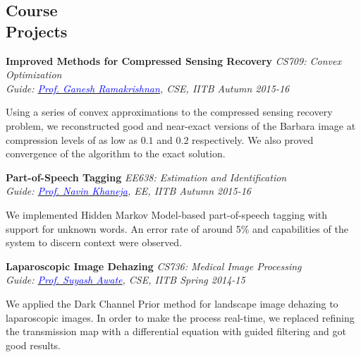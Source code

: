 \documentclass[margin,line]{res}
\newenvironment{list1}{
  \begin{list}{\ding{113}}{%
      \setlength{\itemsep}{0in}
      \setlength{\parsep}{0in} \setlength{\parskip}{0in}
      \setlength{\topsep}{0in} \setlength{\partopsep}{0in} 
      \setlength{\leftmargin}{0.17in}}}{\end{list}}
\begin{document}
\begin{resume}
\section{\sc Course \\Projects}
{\bf Improved Methods for Compressed Sensing Recovery} \hfill {\it CS709: Convex Optimization} \\
{\em Guide: \href{https://www.cse.iitb.ac.in/~ganesh/}{\textcolor{blue}{Prof. Ganesh Ramakrishnan}}, CSE, IITB \hfill Autumn 2015-16} \\
\vspace*{-.15in}
\begin{list1}
\item[] Using a series of convex approximations to the compressed sensing recovery problem, we reconstructed good and near-exact versions of the Barbara image at compression levels of as low as $0.1$ and $0.2$ respectively. We also proved convergence of the algorithm to the exact solution.
\end{list1}

\vspace*{-0.1in}

{\bf Part-of-Speech Tagging} \hfill \textit{EE638: Estimation and Identification} \\
{\em Guide: \href{https://www.ee.iitb.ac.in/course/~ee638/Navin}{\textcolor{blue}{Prof. Navin Khaneja}}, EE, IITB \hfill Autumn 2015-16} \\
\vspace*{-.15in}
\begin{list1}
\item[] We implemented Hidden Markov Model-based part-of-speech tagging with support for unknown words. An error rate of around 5\% and capabilities of the system to discern context were observed.
\end{list1}

\vspace*{-0.1in}

{\bf Laparoscopic Image Dehazing} \hfill \textit{CS736: Medical Image Processing} \\
{\em Guide: \href{https://www.cse.iitb.ac.in/~suyash}{\textcolor{blue}{Prof. Suyash Awate}}, CSE, IITB \hfill Spring 2014-15} \\
\vspace*{-.15in}
\begin{list1}
\item[] We applied the Dark Channel Prior method for landscape image dehazing to laparoscopic images. In order to make the process real-time, we replaced refining the transmission map with a differential equation with guided filtering and got good results.
\end{list1}


\end{resume}
\end{document}
